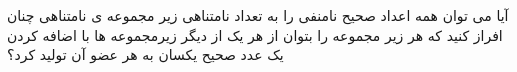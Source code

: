 \exercise
آیا می توان همه اعداد صحیح نامنفی را به تعداد نامتناهی زیر مجموعه ی نامتناهی چنان افراز کنید که هر زیر مجموعه را بتوان از هر یک از دیگر زیرمجموعه ها با اضافه کردن یک عدد صحیح یکسان به هر عضو آن تولید کرد؟